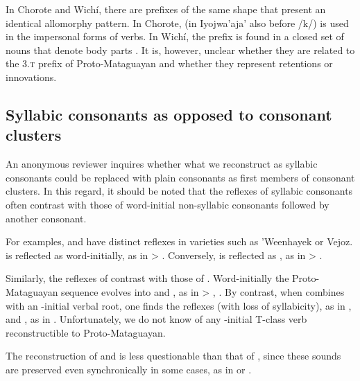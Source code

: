 In Chorote and Wichí, there are prefixes of the same shape that present an identical allomorphy pattern. In Chorote,  (in Iyojwa'aja' also  before /k/) is used in the impersonal forms of verbs. In Wichí, the prefix  is found in a closed set of nouns that denote body parts \citep[164–165]{VN14}. It is, however, unclear whether they are related to the 3.\textsc{t} prefix of Proto-Mataguayan and whether they represent retentions or innovations.

\subsection{Syllabic consonants as opposed to consonant clusters}

An anonymous reviewer inquires whether what we reconstruct as syllabic consonants could be replaced with plain consonants as first members of consonant clusters. In this regard, it should be noted that the reflexes of syllabic consonants often contrast with those of word-initial non-syllabic consonants followed by another consonant.

For examples,  and  have distinct reflexes in varieties such as ’Weenhayek or Vejoz.  is reflected as  word-initially, as in  > . Conversely,  is reflected as , as in  > .

Similarly, the reflexes of  contrast with those of . Word-initially the Proto-Mataguayan sequence  evolves into  and , as in  > , . By contrast, when  combines with an \mbox{-}initial verbal root, one finds the reflexes  (with loss of syllabicity), as in , and , as in . Unfortunately, we do not know of any \mbox{-}initial T\mbox{-}class verb reconstructible to Proto-Mataguayan.

The reconstruction of  and  is less questionable than that of , since these sounds are preserved even synchronically in some cases, as in  or .
